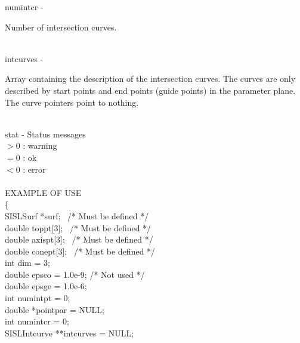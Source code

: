         \>\>    {\fov numintcr}\> - \>  \begin{minipg2}
                                Number of intersection curves.
                                \end{minipg2}\\
        \>\>    {\fov intcurves}\> - \> \begin{minipg2}
                                Array containing the description of the intersection
                                curves. The curves are only described by
                                start points and end points (guide points) in
                                the parameter plane. The curve pointers point to
                                nothing.
                                \end{minipg2}\\[0.3ex]
        \>\>    {\fov stat}     \> - \> Status messages\\
                \>\>\>\>\>              $> 0$   : warning\\
                \>\>\>\>\>              $= 0$   : ok\\
                \>\>\>\>\>              $< 0$   : error\\
\\
EXAMPLE OF USE\\
                \>      \{ \\
                \>\>    SISLSurf        \>      *{\fov surf}; \, /* Must be defined */\\
                \>\>    double  \>      {\fov toppt}[3]; \, /* Must be defined */\\
                \>\>    double  \>      {\fov axispt}[3]; \, /* Must be defined */\\
                \>\>    double  \>      {\fov conept}[3]; \, /* Must be defined */\\
                \>\>    int     \>      {\fov dim} = 3;\\
                \>\>    double  \>      {\fov epsco} = 1.0e-9; /* Not used */\\
                \>\>    double  \>      {\fov epsge} = 1.0e-6;\\
                \>\>    int     \>      {\fov numintpt} = 0;\\
                \>\>    double  \>      *{\fov pointpar} = NULL;\\
                \>\>    int     \>      {\fov numintcr} = 0;\\
                \>\>    SISLIntcurve\>  **{\fov intcurves} = NULL;\\

